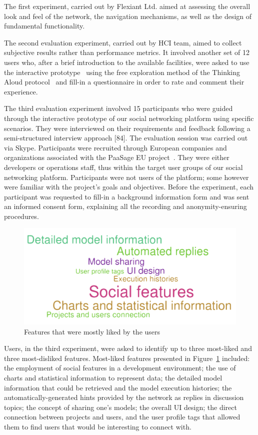 The first experiment, carried out by Flexiant Ltd. aimed at assessing the overall look and feel of the network, the navigation mechanisms, as well as the design of fundamental functionality.

The second evaluation experiment, carried out by HCI team, aimed to collect subjective results rather than performance metrics. It involved another set of 12 users who, after a brief introduction to the available facilities, were asked to use the interactive prototype~\cite{Virzi1996} using the free exploration method of the Thinking Aloud protocol~\cite{jordan1998introduction} and fill-in a questionnaire in order to rate and comment their experience. 

The third evaluation experiment involved 15 participants who were guided through the interactive prototype of our social networking platform using specific scenarios. They were interviewed on their requirements and feedback following a semi-structured interview approach [84]. The evaluation session was carried out via Skype. Participants were recruited through European companies and organizations associated with the PaaSage EU project~\cite{paasage}. They were either developers or operations staff, thus within the target user groups of our social networking platform. Participants were not users of the  platform; some however were familiar with the project’s goals and objectives. Before the experiment, each participant was requested to fill-in a background information form and was sent an informed consent form, explaining all the recording and anonymity-ensuring procedures. 

\begin{figure}[h]
	\centering
	\includegraphics[width=1\textwidth,natwidth=200,natheight=150]{./fig/most-liked.pdf}
	\caption{Features that were mostly liked by the users}
	\label{fig:most-liked}
\end{figure}

Users, in the third experiment, were asked to identify up to three most-liked and three most-disliked features. Most-liked features presented in Figure~\ref{fig:most-liked} included: the employment of social features in a development environment; the use of charts and statistical information to represent data; the detailed model information that could be retrieved and the model execution histories; the automatically-generated hints provided by the network as replies in discussion topics; the concept of sharing one’s models; the overall UI design; the direct connection between projects and users, and the user profile tags that allowed them to find users that would be interesting to connect with.


